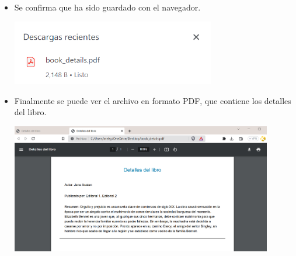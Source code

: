 \documentclass{article}
\begin{document}
\begin{itemize}
\item Se confirma que ha sido guardado con el navegador.

\begin{minipage}{\linewidth}
    \centering
    \includegraphics[width=0.70\textwidth]{imagenes/img11.png}
\end{minipage}
\vspace{\baselineskip}
\item Finalmente se puede ver el archivo en formato PDF, que contiene los detalles del libro.

\begin{minipage}{\linewidth}
    \centering
    \includegraphics[width=0.90\textwidth]{imagenes/img12.png}
\end{minipage}

\end{itemize}
\end{document}
